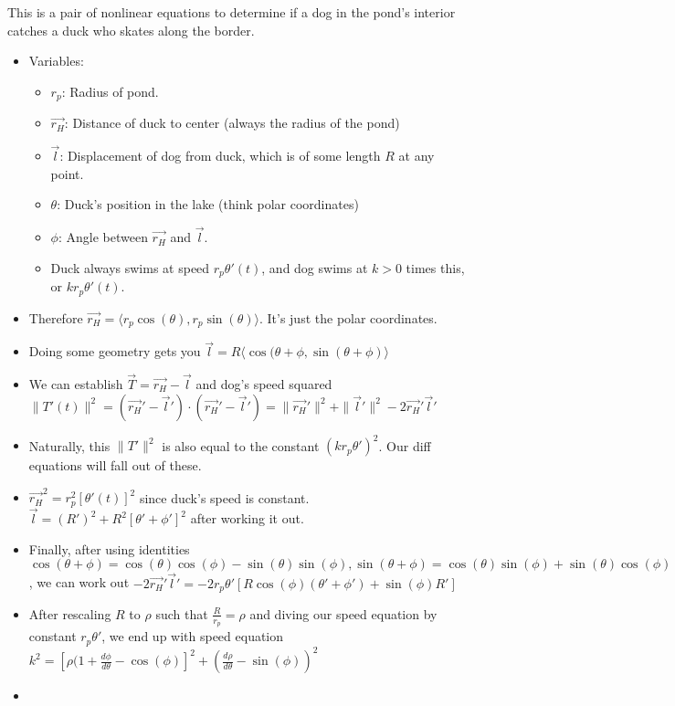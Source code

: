 \documentclass[11pt, oneside]{article}   	%
\begin{document}
This is a pair of nonlinear equations to determine if a dog in the pond's interior catches a duck who skates along the border.
\begin{itemize}
\item Variables:
\begin{itemize}
\item $r_p$: Radius of pond.
\item  $\vec{r_H}$: Distance of duck to center (always the radius of the pond)
\item $\vec{l}$: Displacement of dog from duck, which is of some length $R$ at any point.
\item $\theta$: Duck's position in the lake (think polar coordinates)
\item $\phi$: Angle between $\vec{r_H}$ and $\vec{l}$.  
\item Duck always swims at  speed $r_p\theta'(t)$, and dog swims at $k > 0$ times this, or $kr_p\theta'(t)$.
\end{itemize}
\item Therefore $\vec{r_H} = \langle r_p \cos(\theta), r_p \sin(\theta) \rangle$. It's just the polar coordinates.
\item Doing some geometry gets you $\vec{l} = R \langle \cos(\theta + \phi, \sin(\theta + \phi) \rangle$
\item We can establish $\vec{T} = \vec{r_H} - \vec{l}$ and dog's speed squared $\|T'(t)\|^2 =( \vec{r_H}' - \vec{l}')\cdot ( \vec{r_H}' - \vec{l}') = \|\vec{r_H}'\|^2 + \|\vec{l}'\|^2 - 2\vec{r_H}'\vec{l}'$
\item Naturally, this  $\|T'\|^2$ is also equal to the constant $(kr_p\theta')^2$.  Our diff equations will fall out of these.
\item $\vec{r_H}^2 = r_p^2[\theta'(t)]^2$ since duck's speed is constant. $\vec{l} = (R')^2 + R^2[\theta'+\phi']^2$ after working it out.
\item Finally, after using identities $\cos(\theta + \phi) = \cos(\theta)\cos(\phi) -  \sin(\theta)\sin(\phi), \sin(\theta + \phi) = \cos(\theta)\sin(\phi) +  \sin(\theta)\cos(\phi)$, we can work out $-2\vec{r_H}'\vec{l}' = -2r_p\theta'[R\cos(\phi)(\theta' + \phi') + \sin(\phi)R']$
\item After rescaling $R$ to $\rho$ such that $\frac{R}{r_p} = \rho$ and diving our speed equation by constant $r_p\theta'$, we end up with speed equation $k^2 = [\rho(1+ \frac{d\phi}{d\theta} - \cos(\phi)]^2 + (\frac{d\rho}{d\theta} - \sin(\phi))^2$
\item 


\end{itemize}
\end{document}
